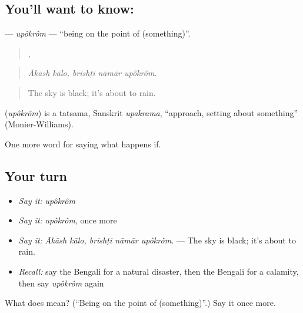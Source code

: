 \subsection*{You'll want to know: }
\textbf{} — \emph{upôkrôm} — \textquotedblleft{}being on the point of (something)\textquotedblright{}.

\begin{quote}
 ,   
\end{quote}

\begin{quote}
\emph{Ākāsh kālo, brishṭi nāmār upôkrôm.}
\end{quote}

\begin{quote}
The sky is black; it's about to rain.
\end{quote}

\begin{cousinweb}
\textbf{} (\emph{upôkrôm}) is a tatsama, Sanskrit \emph{upakrama}, \textquotedblleft{}approach, setting about something\textquotedblright{} (Monier-Williams).
\end{cousinweb}

\begin{grammarlens}[title={What you've built}]
One more word for saying what happens if.
\end{grammarlens}

\subsection*{Your turn}
\begin{itemize}
\raggedright
  \item \emph{Say it:} \emph{upôkrôm}
  \item \emph{Say it:} \emph{upôkrôm}, once more
  \item \emph{Say it:} \emph{Ākāsh kālo, brishṭi nāmār upôkrôm.} — The sky is black; it's about to rain.
  \item \emph{Recall:} say the Bengali for a natural disaster, then the Bengali for a calamity, then say \emph{upôkrôm} again
\end{itemize}

\begin{tcolorbox}[breakable,colback=teal!4,colframe=teal!35!black,title={Before you move on}]
What does  mean? (\textquotedblleft{}Being on the point of (something)\textquotedblright{}.) Say it once more.
\end{tcolorbox}
